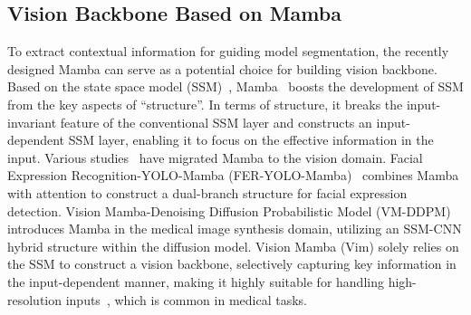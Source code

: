 \subsection{Vision Backbone Based on Mamba}
To extract contextual information for guiding model segmentation, the recently designed Mamba can serve as a potential choice for building vision backbone. Based on the state space model (SSM)~\cite{gu2023modeling}, Mamba~\cite{gu2023mamba} boosts the development of SSM from the key aspects of ``structure''. In terms of structure, it breaks the input-invariant feature of the conventional SSM layer and constructs an input-dependent SSM layer, enabling it to focus on the effective information in the input. Various studies~\cite{ma2024fer,ju2024vm,zheng2024fd,ma2024u,zhu2024vision} have migrated Mamba to the vision domain. Facial Expression Recognition-YOLO-Mamba (FER-YOLO-Mamba)~\cite{ma2024fer} combines Mamba with attention to construct a dual-branch structure for facial expression detection. Vision Mamba-Denoising Diffusion Probabilistic Model (VM-DDPM)~\cite{ju2024vm} introduces Mamba in the medical image synthesis domain, utilizing an SSM-CNN hybrid structure within the diffusion model. Vision Mamba (Vim) solely relies on the SSM to construct a vision backbone, selectively capturing key information in the input-dependent manner, making it highly suitable for handling high-resolution inputs~\cite{zhu2024vision}, which is common in medical tasks. 
